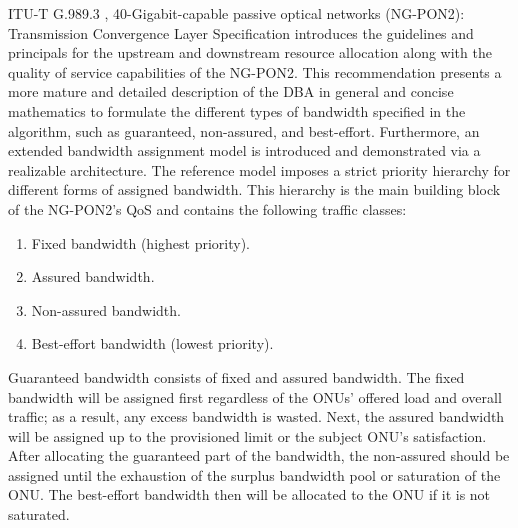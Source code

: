 ITU-T G.989.3 \cite{ITU_g.989.3_nodate}, 40-Gigabit-capable passive optical networks (\ac{NG-PON2}): Transmission Convergence Layer Specification introduces the guidelines and principals for the upstream and downstream resource allocation along with the quality of service capabilities of the \ac{NG-PON2}. This recommendation presents a more mature and detailed description of the \ac{DBA} in general and concise mathematics to formulate the different types of bandwidth specified in the algorithm, such as guaranteed, non-assured, and best-effort. Furthermore, an extended bandwidth assignment model is introduced and demonstrated via a realizable architecture. The reference model imposes a strict priority hierarchy for different forms of assigned bandwidth. This hierarchy is the main building block of the \ac{NG-PON2}'s \ac{QoS} and contains the following traffic classes:

\begin{enumerate}
\item Fixed bandwidth (highest priority).
\item Assured bandwidth.
\item Non-assured bandwidth.
\item Best-effort bandwidth (lowest priority).
\end{enumerate}

Guaranteed bandwidth consists of fixed and assured bandwidth. The fixed bandwidth will be assigned first regardless of the \acp{ONU}' offered load and overall traffic; as a result, any excess bandwidth is wasted. Next, the assured bandwidth will be assigned up to the provisioned limit or the subject \ac{ONU}'s satisfaction. After allocating the guaranteed part of the bandwidth, the non-assured should be assigned until the exhaustion of the surplus bandwidth pool or saturation of the \ac{ONU}. The best-effort bandwidth then will be allocated to the \ac{ONU} if it is not saturated.



